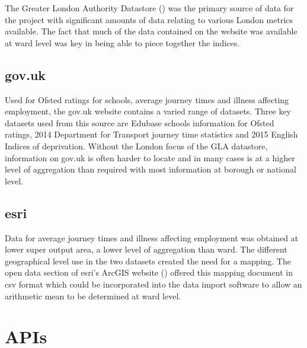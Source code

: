 The Greater London Authority Datastore (\cite{GLA}) was the primary source of data for the project with significant amounts of data relating to various London metrics available. The fact that much of the data contained on the website was available at ward level was key in being able to piece together the indices.



\subsection{gov.uk}

Used for Ofsted ratings for schools, average journey times and illness affecting employment, the gov.uk website contains a varied range of datasets. 
Three key datasets used from this source are Edubase schools information for Ofsted ratings, 2014 Department for Transport journey time statistics and 2015 English Indices of deprivation.
Without the London focus of the GLA datastore, information on gov.uk is often harder to locate and in many cases is at a higher level of aggregation than required with most information at borough or national level.


\subsection{esri}

Data for average journey times and illness affecting employment was obtained at lower super output area, a lower level of aggregation than ward. The different geographical level use in the two datasets created the need for a mapping. The open data section of esri's ArcGIS website (\cite{ArcGIS}) offered this mapping document in csv format which could be incorporated into the data import software to allow an arithmetic mean to be determined at ward level.



\section{APIs}


